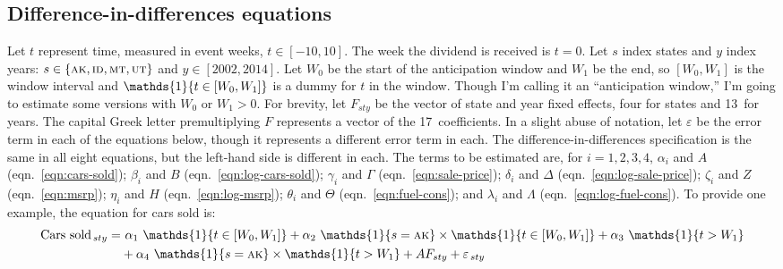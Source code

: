 \documentclass[11pt,letterpaper,oneside]{article}
\let\originalleft\left
\let\originalright\right
\renewcommand{\left}{\mathopen{}\mathclose\bgroup\originalleft}
\renewcommand{\right}{\aftergroup\egroup\originalright}
\newcommand{\msrp}{\textsc{msrp}}
\newcommand{\indicator}[1]{\mathds{1}\left\{#1\right\}}
\newcommand{\anticipation}{\indicator{t \in [W_0, W_1]}}
\newcommand{\isAlaska}{\indicator{s = \textsc{ak}}}
\newcommand{\postWindow}{\indicator{t > W_1}}
\newcommand{\ddEqn}[3]{%
\text{#1}_{\, sty} = & \  #2_1 \ \anticipation + #2_2 \ \isAlaska \times \anticipation + #2_3 \ \postWindow \\ \nonumber
&+ #2_4 \ \isAlaska \times \postWindow + #3 F_{ sty} + \varepsilon_{\, sty}
}
\newcommand{\ddEqnLog}[3]{%
\ln\left(\text{#1}_{\, sty}\right) = & \  #2_1 \ \anticipation + #2_2 \ \isAlaska \times \anticipation + #2_3 \ \postWindow \\ \nonumber
&+ #2_4 \ \isAlaska \times \postWindow + #3 F_{ sty} + \varepsilon_{\, sty}
}
\begin{document}
\begin{doublespacing}
\subsection{Difference-in-differences equations}
Let $t$ represent time, measured in event weeks, $t \in [-10, 10]$.
The week the dividend is received is $t=0$.
Let $s$ index states and $y$ index years: $s \in \{\textsc{ak}, \textsc{id},\textsc{mt},\textsc{ut} \}$ and $y \in [2002, 2014]$.
Let $W_0$ be the start of the anticipation window and $W_1$ be the end, so $[W_0, W_1]$ is the window interval and $\anticipation$ is a dummy for $t$ in the window.
Though I'm calling it an ``anticipation window,'' I'm going to estimate some versions with $W_0$ or $W_1 > 0$.
For brevity, let $F_{sty}$ be the vector of state and year fixed effects, four for states and 13~for years.
The capital Greek letter premultiplying $F$ represents a vector of the 17~coefficients.
In a slight abuse of notation, let $\varepsilon$ be the error term in each of the equations below, though it represents a different error term in each.
The difference\hyp{}in\hyp{}differences specification is the same in all eight equations, but the left\hyp{}hand side is different in each.
The terms to be estimated are, for $i = 1,2,3,4$,
$\alpha_i$ and $A$ (eqn.~\ref{eqn:cars-sold});
$\beta_i$ and $B$ (eqn.~\ref{eqn:log-cars-sold});
$\gamma_i$ and $\Gamma$ (eqn.~\ref{eqn:sale-price});
$\delta_i$ and $\Delta$ (eqn.~\ref{eqn:log-sale-price});
$\zeta_i$ and $Z$ (eqn.~\ref{eqn:msrp});
$\eta_i$ and $H$ (eqn.~\ref{eqn:log-msrp});
$\theta_i$ and $\Theta$ (eqn.~\ref{eqn:fuel-cons}); and
$\lambda_i$ and $\Lambda$ (eqn.~\ref{eqn:log-fuel-cons}).
To provide one example, the equation for cars sold is:
\begin{align}
    \label{eqn:cars-sold}
    \ddEqn{Cars sold}{\alpha}{A}
\end{align}


\end{doublespacing}
\end{document}
